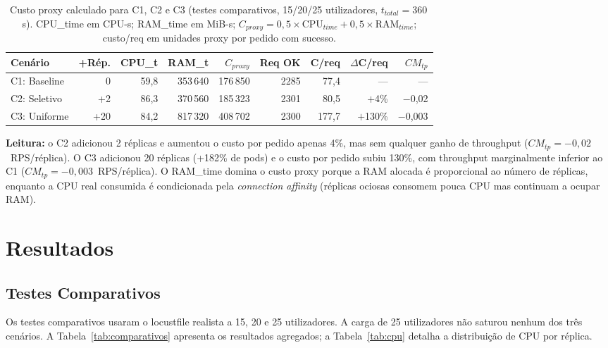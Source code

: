 \documentclass[manuscript,oneside]{acmart}
\begin{document}
\begin{table}[H]
\caption{Custo proxy calculado para C1, C2 e C3 (testes comparativos, 15/20/25 utilizadores, $t_{total}=360$\,s). CPU\_time em CPU-s; RAM\_time em MiB-s; $C_{proxy} = 0{,}5\times\text{CPU}_{time} + 0{,}5\times\text{RAM}_{time}$; custo/req em unidades proxy por pedido com sucesso.}
\label{tab:custo}
{\footnotesize
\begin{tabular}{lrrrrrrrr}
\toprule
\textbf{Cenário} & \textbf{+Rép.} & \textbf{CPU\_t} & \textbf{RAM\_t} & \textbf{$C_{proxy}$} & \textbf{Req OK} & \textbf{C/req} & \textbf{$\Delta$C/req} & \textbf{$CM_{tp}$} \\
\midrule
C1: Baseline & 0   & 59{,}8 & 353\,640 & 176\,850 & 2285 & 77{,}4 & — & — \\
C2: Seletivo & +2  & 86{,}3 & 370\,560 & 185\,323 & 2301 & 80{,}5 & $+$4\%   & $-$0{,}02 \\
C3: Uniforme & +20 & 84{,}2 & 817\,320 & 408\,702 & 2300 & 177{,}7 & $+$130\% & $-$0{,}003 \\
\bottomrule
\end{tabular}%
}
\end{table}

\textbf{Leitura:} o C2 adicionou 2 réplicas e aumentou o custo por pedido apenas 4\%, mas sem qualquer ganho de throughput ($CM_{tp}=-0{,}02$~RPS/réplica). O C3 adicionou 20 réplicas (+182\% de pods) e o custo por pedido subiu 130\%, com throughput marginalmente inferior ao C1 ($CM_{tp}=-0{,}003$~RPS/réplica). O RAM\_time domina o custo proxy porque a RAM alocada é proporcional ao número de réplicas, enquanto a CPU real consumida é condicionada pela \textit{connection affinity} (réplicas ociosas consomem pouca CPU mas continuam a ocupar RAM).

\section{Resultados}
\label{sec:resultados}

\subsection{Testes Comparativos}
\label{sec:comparativos}

Os testes comparativos usaram o locustfile realista a 15, 20 e 25 utilizadores. A carga de 25 utilizadores não saturou nenhum dos três cenários. A Tabela~\ref{tab:comparativos} apresenta os resultados agregados; a Tabela~\ref{tab:cpu} detalha a distribuição de CPU por réplica.
\end{document}
